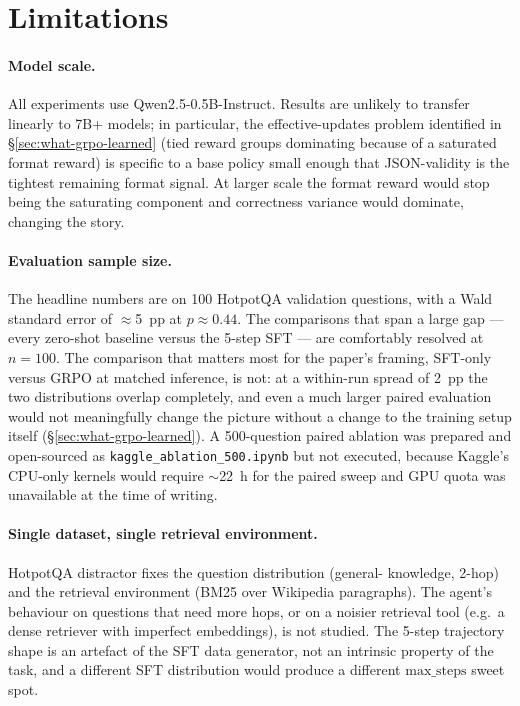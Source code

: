 \documentclass[11pt]{article}
\begin{document}
\section{Limitations}
\label{sec:limitations}

\paragraph{Model scale.}
All experiments use Qwen2.5-0.5B-Instruct. Results are unlikely to
transfer linearly to 7B+ models; in particular, the effective-updates
problem identified in §\ref{sec:what-grpo-learned} (tied reward
groups dominating because of a saturated format reward) is specific
to a base policy small enough that JSON-validity is the tightest
remaining format signal. At larger scale the format reward would
stop being the saturating component and correctness variance would
dominate, changing the story.

\paragraph{Evaluation sample size.}
The headline numbers are on 100 HotpotQA validation questions,
with a Wald standard error of $\approx$5~pp at $p{\approx}0.44$.
The comparisons that span a large gap --- every zero-shot
baseline versus the 5-step SFT --- are comfortably resolved at
$n{=}100$. The comparison that matters most for the paper's
framing, SFT-only versus GRPO at matched inference, is not: at a
within-run spread of 2~pp the two distributions overlap
completely, and even a much larger paired evaluation would not
meaningfully change the picture without a change to the training
setup itself (§\ref{sec:what-grpo-learned}). A 500-question
paired ablation was prepared and open-sourced as
\texttt{kaggle\_ablation\_500.ipynb} but not executed, because
Kaggle's CPU-only kernels would require $\sim$22~h for the
paired sweep and GPU quota was unavailable at the time of
writing.

\paragraph{Single dataset, single retrieval environment.}
HotpotQA distractor fixes the question distribution (general-
knowledge, 2-hop) and the retrieval environment (BM25 over
Wikipedia paragraphs). The agent's behaviour on questions that need
more hops, or on a noisier retrieval tool (e.g.\ a dense retriever
with imperfect embeddings), is not studied. The 5-step trajectory
shape is an artefact of the SFT data generator, not an intrinsic
property of the task, and a different SFT distribution would produce
a different $\mathrm{max\_steps}$ sweet spot.
\end{document}
